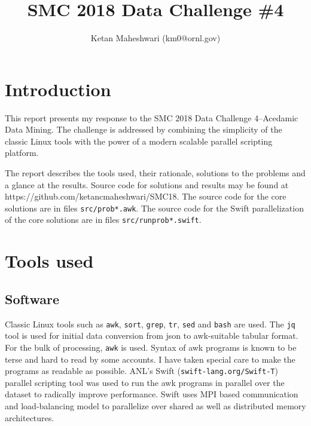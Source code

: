 \documentclass{article}
\title{SMC 2018 Data Challenge \#4}
\author{Ketan Maheshwari (km0@ornl.gov)}
\begin{document}
\maketitle
\section*{Introduction}

This report presents my response to the SMC 2018 Data Challenge 4--Acedamic
Data Mining. The challenge is addressed by combining the simplicity of the
classic Linux tools with the power of a modern scalable parallel scripting
platform.

The report describes the tools used, their rationale, solutions to the problems
and a glance at the results. Source code for solutions and results may be found
at https://github.com/ketancmaheshwari/SMC18. The source code for the core
solutions are in files \texttt{src/prob*.awk}. The source code for the Swift
parallelization of the core solutions are in files \texttt{src/runprob*.swift}.

\section*{Tools used}
\subsection*{Software}
Classic Linux tools such as \texttt{awk}, \texttt{sort}, \texttt{grep},
\texttt{tr}, \texttt{sed} and \texttt{bash} are used.  The \texttt{jq} tool is
used for initial data conversion from json to awk-suitable tabular format. For
the bulk of processing, \texttt{awk} is used. Syntax of awk programs is known
to be terse and hard to read by some accounts. I have taken special care to
make the programs as readable as possible.  ANL's Swift
(\texttt{swift-lang.org/Swift-T}) parallel scripting tool was used to run the
awk programs in parallel over the dataset to radically improve performance.
Swift uses MPI based communication and load-balancing model to parallelize over
shared as well as distributed memory architectures.
\end{document}

